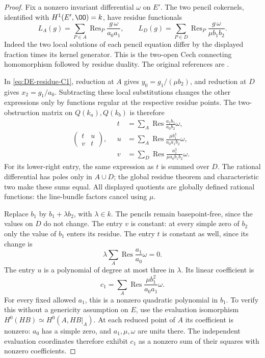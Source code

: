 \begin{proof}
Fix a nonzero invariant differential $\omega$ on $E'$.
The two pencil cokernels, identified with $H^1(E',\OO)=k$, have
residue functionals
\[
 L_A(g)=\sum_{P\in A}\operatorname{Res}_P
              \frac{g\,\omega}{a_0a_1},\qquad
 L_D(g)=\sum_{P\in D}\operatorname{Res}_P
              \frac{g\,\omega}{\mu b_1b_2}.
\]
Indeed the two local solutions of each pencil equation differ by
the displayed fraction times its kernel generator.  This is the
two-open Cech connecting homomorphism followed by residue duality.
The original references are \cite[Theorem~2 and Theorem~3 with its
corollary, pp.~155--156; Section~4, Theorem~5 and its corollary,
pp.~157--159]{Tate1968Residues}.

In \eqref{eq:DE-residue-C1}, reduction at $A$ gives
$y_0=g_1/(\mu b_2)$, and reduction at $D$ gives $x_2=g_1/a_0$.
Subtracting these local substitutions changes the other expressions
only by functions regular at the respective residue points.
The two-obstruction matrix on $Q(k_a),Q(k_b)$ is therefore
\[
 \begin{pmatrix}t&u\\v&t\end{pmatrix},
\quad
\begin{split}
 t&=\sum_A\operatorname{Res}\frac{a_1b_1}{a_0b_2}\omega,\\
 u&=\sum_A\operatorname{Res}\frac{\mu b_1^3}{a_0a_1b_2}\omega,\\
 v&=\sum_D\operatorname{Res}\frac{a_1^3}{\mu a_0b_1b_2}\omega .
\end{split}
\]
For its lower-right entry, the same expression as $t$ is summed
over $D$.  The rational differential has poles only in $A\cup D$;
the global residue theorem and characteristic two make these sums
equal.  All displayed quotients are globally defined rational
functions: the line-bundle factors cancel using $\mu$.

Replace $b_1$ by $b_1+\lambda b_2$, with $\lambda\in k$.
The pencils remain basepoint-free, since the values on $D$ do not
change.  The entry $v$ is constant: at every simple zero of $b_2$
only the value of $b_1$ enters its residue.
The entry $t$ is constant as well, since its change is
\[
 \lambda\sum_A\operatorname{Res}\frac{a_1}{a_0}\omega=0.
\]
The entry $u$ is a polynomial of degree at most three in $\lambda$.
Its linear coefficient is
\[
 c_1=\sum_A\operatorname{Res}\frac{\mu b_1^2}{a_0a_1}\omega.
\]
For every fixed allowed $a_1$, this is a nonzero quadratic polynomial
in $b_1$.  To verify this without a genericity assumption on $E$,
use the evaluation isomorphism $H^0(HB)\simeq H^0(A,HB|_A)$.
At each reduced point of $A$ its coefficient is nonzero:
$a_0$ has a simple zero, and $a_1,\mu,\omega$ are units there.
The independent evaluation coordinates therefore exhibit $c_1$
as a nonzero sum of their squares with nonzero coefficients.


\end{proof}
